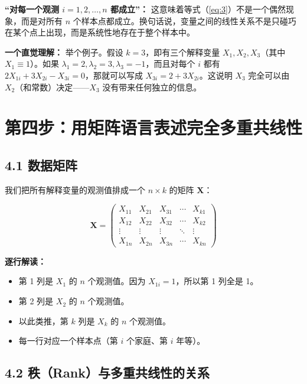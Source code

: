 \documentclass[12pt,a4paper]{ctexart}
\begin{document}
\textbf{“对每一个观测 $i=1,2,\ldots,n$ 都成立”：} 这意味着等式（\ref{eq:3}）不是一个偶然现象，而是对所有 $n$ 个样本点都成立。换句话说，变量之间的线性关系不是只碰巧在某个点上出现，而是系统性地存在于整个样本中。

\textbf{一个直觉理解：} 举个例子。假设 $k=3$，即有三个解释变量 $X_1, X_2, X_3$（其中 $X_1 \equiv 1$）。如果 $\lambda_1=2, \lambda_2=3, \lambda_3=-1$，而且对每个 $i$ 都有 $2X_{1i} + 3X_{2i} - X_{3i} = 0$，那就可以写成 $X_{3i} = 2 + 3X_{2i}$。这说明 $X_3$ 完全可以由 $X_2$（和常数）决定——$X_3$ 没有带来任何独立的信息。

\section*{第四步：用矩阵语言表述完全多重共线性}

\subsection*{4.1 数据矩阵}

我们把所有解释变量的观测值排成一个 $n \times k$ 的矩阵 $\boldsymbol{X}$：

\begin{equation}
\boldsymbol{X} = \begin{pmatrix}
X_{11} & X_{21} & X_{31} & \cdots & X_{k1} \\
X_{12} & X_{22} & X_{32} & \cdots & X_{k2} \\
\vdots & \vdots & \vdots & \ddots & \vdots \\
X_{1n} & X_{2n} & X_{3n} & \cdots & X_{kn}
\end{pmatrix} \label{eq:4}
\end{equation}

\textbf{逐行解读：}

\begin{itemize}
    \item 第 1 列是 $X_1$ 的 $n$ 个观测值。因为 $X_{1i}=1$，所以第 1 列全是 1。
    \item 第 2 列是 $X_2$ 的 $n$ 个观测值。
    \item 以此类推，第 $k$ 列是 $X_k$ 的 $n$ 个观测值。
    \item 每一行对应一个样本点（第 $i$ 个家庭、第 $i$ 年等）。
\end{itemize}

\subsection*{4.2 秩（Rank）与多重共线性的关系}
\end{document}
